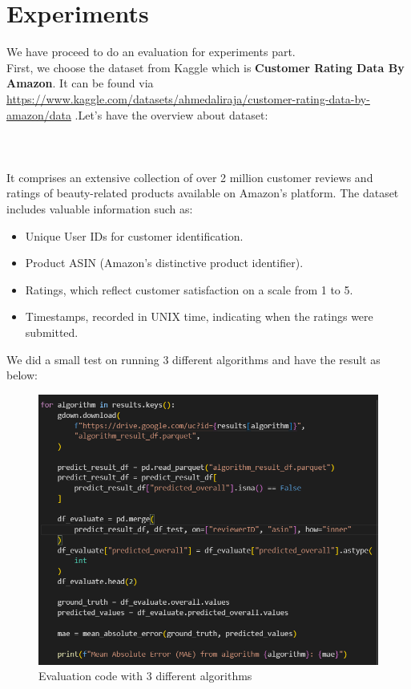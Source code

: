 \section{Experiments}
We have proceed to do an evaluation for experiments part.\\
First, we choose the dataset from Kaggle which is \textbf{Customer Rating Data By Amazon}. It can be found via \url{https://www.kaggle.com/datasets/ahmedaliraja/customer-rating-data-by-amazon/data} .Let's have the overview about dataset:\\
\\
\\
\\
It comprises an extensive collection of over 2 million customer reviews and ratings of beauty-related products available on Amazon's platform. The dataset includes valuable information such as:
\begin{itemize}
    \item Unique User IDs for customer identification.
    \item Product ASIN (Amazon's distinctive product identifier).
    \item Ratings, which reflect customer satisfaction on a scale from 1 to 5.
    \item Timestamps, recorded in UNIX time, indicating when the ratings were submitted.
\end{itemize}
\indent  We did a small test on running 3 different algorithms and have the result as below:
\begin{figure}
    \centering
    \includegraphics[scale = 0.6]{image/evaluation.png}
    \caption{Evaluation code with 3 different algorithms}
    \label{fig:enter-label}
\end{figure}
